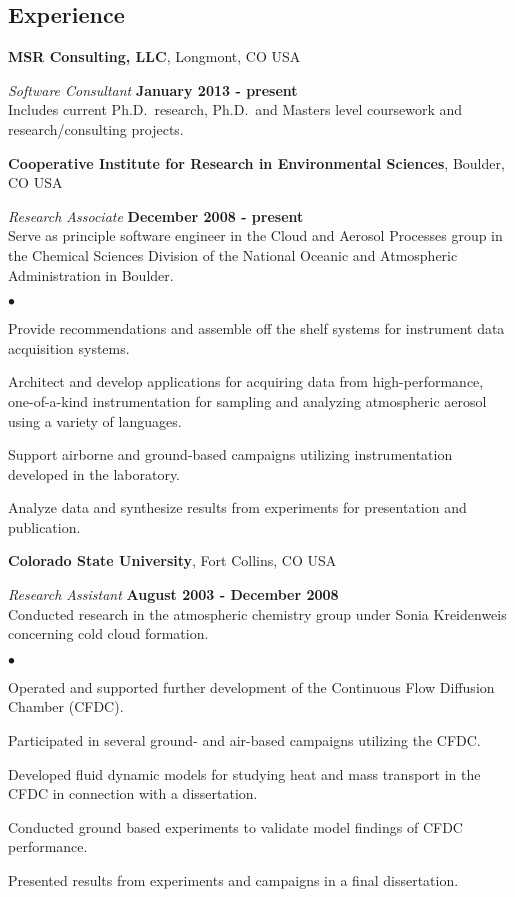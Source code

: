 \documentclass[margin,line]{res}
\newenvironment{list2}{
  \begin{list}{$\bullet$}{%
      \setlength{\itemsep}{0in}
      \setlength{\parsep}{0in} \setlength{\parskip}{0in}
      \setlength{\topsep}{0in} \setlength{\partopsep}{0in} 
      \setlength{\leftmargin}{0.2in}}}{\end{list}}
\begin{document}
\begin{resume}
\section{\sc Experience}
{\bf MSR Consulting, LLC}, Longmont, CO USA

\vspace{-.3cm}
{\em Software Consultant} \hfill {\bf January 2013 - present}\\
Includes current Ph.D.~research, Ph.D.~and Masters level coursework and
research/consulting projects.


{\bf Cooperative Institute for Research in Environmental Sciences}, Boulder, CO USA

\vspace{-.3cm}
{\em Research Associate} \hfill {\bf December 2008 - present}\\
Serve as principle software engineer in the Cloud and Aerosol Processes group in the Chemical Sciences Division of the National Oceanic and Atmospheric Administration in Boulder.  
\vspace*{.05in} 
\begin{list2}
	\item Provide recommendations and assemble off the shelf systems for instrument data acquisition systems.
	\item Architect and develop applications for acquiring data from high-performance, one-of-a-kind instrumentation for sampling and analyzing atmospheric aerosol using a variety of languages.
	\item Support airborne and ground-based campaigns utilizing instrumentation developed in the laboratory.
	\item Analyze data and synthesize results from experiments for presentation and publication.
\end{list2}


{\bf Colorado State University}, Fort Collins, CO USA

\vspace{-.3cm}
{\em Research Assistant} \hfill {\bf August 2003 - December 2008}\\
Conducted research in the atmospheric chemistry group under Sonia Kreidenweis concerning cold cloud formation. 
\vspace*{.05in}  
\begin{list2}
	\item Operated and supported further development of the Continuous Flow Diffusion Chamber (CFDC).
	\item Participated in several ground- and air-based campaigns utilizing the CFDC.
	\item Developed fluid dynamic models for studying heat and mass transport in the CFDC in connection with a dissertation.
	\item Conducted ground based experiments to validate model findings of CFDC performance.
	\item Presented results from experiments and campaigns in a final dissertation.
\end{list2}



\end{resume}
\end{document}
